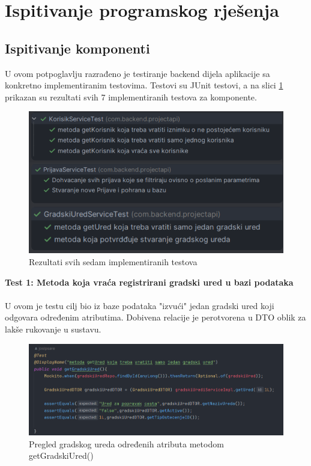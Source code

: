 	
		\section{Ispitivanje programskog rješenja}
	
			
			\subsection{Ispitivanje komponenti}
			
			U ovom potpoglavlju razrađeno je testiranje backend dijela aplikacije sa konkretno implementiranim testovima. Testovi su JUnit testovi, a na slici \ref{fig:implementacijatestovi} prikazan su rezultati svih 7 implementiranih testova za komponente.\\
			\begin{figure}[H]
			\includegraphics[scale=0.6]{slike/testoviBackend.PNG} %
			\centering
			\caption{Rezultati svih sedam implementiranih testova}
			
			 \label{fig:implementacijatestovi}
		\end{figure}
			\textbf{Test 1: Metoda koja vraća registrirani gradski ured u bazi podataka}\\
			\\ U ovom je testu cilj bio iz baze podataka "izvući" jedan gradski ured koji odgovara određenim atributima. Dobivena relacije je perotvorena u DTO oblik za lakše rukovanje u sustavu.\\
			\begin{figure}[H]
			\includegraphics[scale=0.4]{slike/getUred.PNG} %
			\centering
			\caption{Pregled gradskog ureda određenih atributa metodom getGradskiUred()}
			\label{fig:implementacija}
		\end{figure}
			
